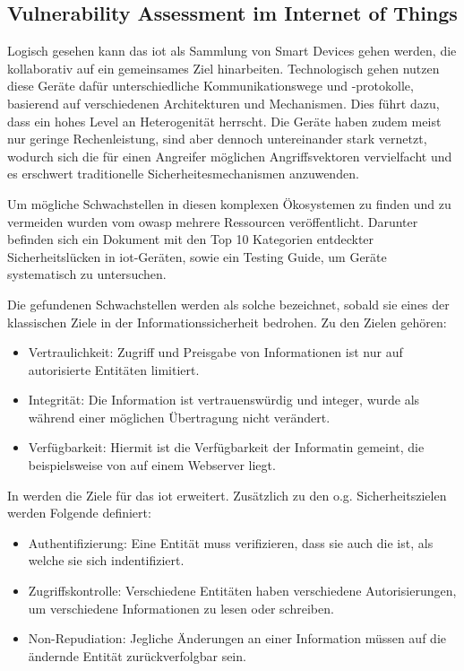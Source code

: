 \subsection{Vulnerability Assessment im Internet of Things}
\label{sec:sota_sa}
    Logisch gesehen kann das \gls{iot} als Sammlung von Smart Devices gehen werden, die kollaborativ auf ein gemeinsames Ziel hinarbeiten. 
    Technologisch gehen nutzen diese Geräte dafür unterschiedliche Kommunikationswege und -protokolle, basierend auf verschiedenen Architekturen und Mechanismen. 
    Dies führt dazu, dass ein hohes Level an Heterogenität herrscht. 
    Die Geräte haben zudem meist nur geringe Rechenleistung, sind aber dennoch untereinander stark vernetzt, wodurch sich die für einen Angreifer möglichen Angriffsvektoren vervielfacht und es erschwert traditionelle Sicherheitesmechanismen anzuwenden.\cite{Sicari2015}
    
    Um mögliche Schwachstellen in diesen komplexen Ökosystemen zu finden und zu vermeiden wurden vom \gls{owasp} mehrere Ressourcen veröffentlicht.
    Darunter befinden sich ein Dokument mit den Top 10 Kategorien entdeckter Sicherheitslücken in \gls{iot}-Geräten\cite{Miessler2015}, sowie ein Testing Guide\cite{Miessler}, um Geräte systematisch zu untersuchen.
    
    Die gefundenen Schwachstellen werden als solche bezeichnet, sobald sie eines der klassischen Ziele\cite{Perrin2008} in der Informationssicherheit bedrohen. 
    Zu den Zielen gehören:
    \begin{itemize}[noitemsep]
        \item Vertraulichkeit: Zugriff und Preisgabe von Informationen ist nur auf autorisierte Entitäten limitiert.
        \item Integrität: Die Information ist vertrauenswürdig und integer, wurde als während einer möglichen Übertragung nicht verändert.
        \item Verfügbarkeit: Hiermit ist die Verfügbarkeit der Informatin gemeint, die beispielsweise von auf einem Webserver liegt.
    \end{itemize}
    
    \noindent In \cite{Sicari2015} werden die Ziele für das \gls{iot} erweitert. 
    Zusätzlich zu den o.g. Sicherheitszielen werden Folgende definiert:
    \begin{itemize}[noitemsep]
        \item Authentifizierung: Eine Entität muss verifizieren, dass sie auch die ist, als welche sie sich indentifiziert.
        \item Zugriffskontrolle: Verschiedene Entitäten haben verschiedene Autorisierungen, um verschiedene Informationen zu lesen oder schreiben.
        \item Non-Repudiation: Jegliche Änderungen an einer Information müssen auf die ändernde Entität zurückverfolgbar sein.
    \end{itemize}
	
